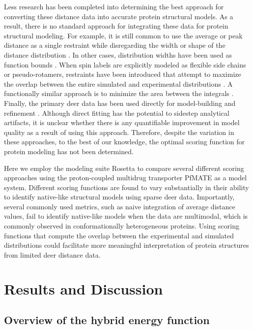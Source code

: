 Less research has been completed into determining the best approach for converting these distance data into accurate protein structural models. As a result, there is no standard approach for integrating these data for protein structural modeling. For example, it is still common to use the average or peak distance as a single restraint while disregarding the width or shape of the distance distribution \citep*{Dastvan2016, Lim2018, VanEps2018}. In other cases, distribution widths have been used as function bounds \citep*{Alexander2008, Dastvan2016a, Evans2020, Fischer2016, Ling2016}. When spin labels are explicitly modeled as flexible side chains or pseudo-rotamers, restraints have been introduced that attempt to maximize the overlap between the entire simulated and experimental distributions \citep*{Hays2019, Kazmier2014a, Marinelli2015, Raghuraman2014, Roux2013}. A functionally similar approach is to minimize the area between the integrals \citep*{Krug2016}. Finally, the primary \gls{deer} data has been used directly for model-building and refinement \citep*{Bowen2018, Hilger2007, Marinelli2019, Reichel2018}. Although direct fitting has the potential to sidestep analytical artifacts, it is unclear whether there is any quantifiable improvement in model quality as a result of using this approach. Therefore, despite the variation in these approaches, to the best of our knowledge, the optimal scoring function for protein modeling has not been determined.

Here we employ the modeling suite Rosetta to compare several different scoring approaches using the proton-coupled multidrug transporter PfMATE as a model system. Different scoring functions are found to vary substantially in their ability to identify native-like structural models using sparse \gls{deer} data. Importantly, several commonly used metrics, such as naive integration of average distance values, fail to identify native-like models when the data are multimodal, which is commonly observed in conformationally heterogeneous proteins. Using scoring functions that compute the overlap between the experimental and simulated distributions could facilitate more meaningful interpretation of protein structures from limited \gls{deer} distance data.

\section{Results and Discussion}

\subsection{Overview of the hybrid energy function}

